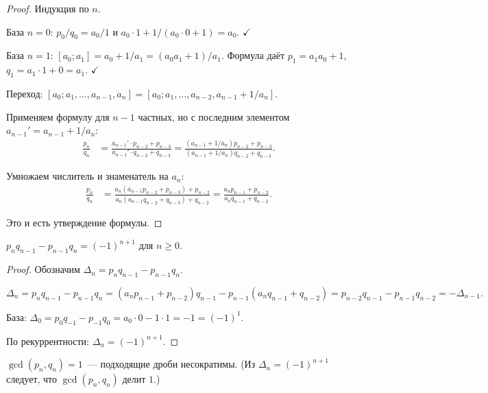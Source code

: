 \documentclass[12pt]{article}
\begin{document}
	\begin{proof}
		Индукция по $n$.
		
		База $n = 0$: $p_0/q_0 = a_0/1$ и $a_0 \cdot 1 + 1 / (a_0 \cdot 0 + 1) = a_0$. $\checkmark$
		
		База $n = 1$: $[a_0; a_1] = a_0 + 1/a_1 = (a_0 a_1 + 1)/a_1$. Формула даёт $p_1 = a_1 a_0 + 1$, $q_1 = a_1 \cdot 1 + 0 = a_1$. $\checkmark$
		
		Переход: $[a_0; a_1, \dots, a_{n-1}, a_n] = [a_0; a_1, \dots, a_{n-2}, a_{n-1} + 1/a_n]$.
		
		Применяем формулу для $n - 1$ частных, но с последним элементом $a_{n-1}' = a_{n-1} + 1/a_n$:
		\begin{align*}
			\frac{p_n}{q_n} &= \frac{a_{n-1}' \cdot p_{n-2} + p_{n-3}}{a_{n-1}' \cdot q_{n-2} + q_{n-3}} = \frac{(a_{n-1} + 1/a_n) p_{n-2} + p_{n-3}}{(a_{n-1} + 1/a_n) q_{n-2} + q_{n-3}}.
		\end{align*}
		
		Умножаем числитель и знаменатель на $a_n$:
		\begin{align*}
			\frac{p_n}{q_n} &= \frac{a_n(a_{n-1} p_{n-2} + p_{n-3}) + p_{n-2}}{a_n(a_{n-1} q_{n-2} + q_{n-3}) + q_{n-2}} = \frac{a_n p_{n-1} + p_{n-2}}{a_n q_{n-1} + q_{n-2}}.
		\end{align*}
		
		Это и есть утверждение формулы.
	\end{proof}
	
	\begin{theorem}
		$p_n q_{n-1} - p_{n-1} q_n = (-1)^{n+1}$ для $n \geqslant 0$.
	\end{theorem}
	
	\begin{proof}
		Обозначим $\Delta_n = p_n q_{n-1} - p_{n-1} q_n$.
		
		\[\Delta_n = p_n q_{n-1} - p_{n-1} q_n = (a_n p_{n-1} + p_{n-2}) q_{n-1} - p_{n-1}(a_n q_{n-1} + q_{n-2}) = p_{n-2} q_{n-1} - p_{n-1} q_{n-2} = -\Delta_{n-1}.\]
		
		База: $\Delta_0 = p_0 q_{-1} - p_{-1} q_0 = a_0 \cdot 0 - 1 \cdot 1 = -1 = (-1)^1$.
		
		По рекуррентности: $\Delta_n = (-1)^{n+1}$.
	\end{proof}
	
	\begin{corollary}
		$\gcd(p_n, q_n) = 1$~--- подходящие дроби несократимы. (Из $\Delta_n = (-1)^{n+1}$ следует, что $\gcd(p_n, q_n)$ делит $1$.)
	\end{corollary}
	
\end{document}
